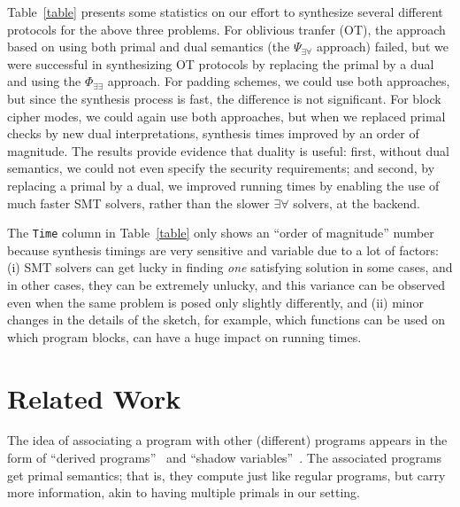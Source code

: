 \documentclass[preprint]{sig-alternate-05-2015}
\begin{document}
Table~\ref{table} presents some statistics on our effort to synthesize 
several different protocols for the above three problems. 
For oblivious tranfer (OT), the approach based on using both primal and dual
semantics (the $\Psi_{\exists\forall}$ approach) failed, but we were 
successful in synthesizing OT protocols by replacing the primal by a dual and
using the $\Phi_{\exists\exists}$ approach. 
For padding schemes, we could use both approaches, but since the synthesis process
is fast, the difference is not significant.
For block cipher modes, we could again use both approaches, but when we replaced
primal checks by new dual interpretations, synthesis times improved by an order
of magnitude.  
The results provide evidence that duality is useful: first, without dual
semantics, we could not even specify the security requirements; and second,
by replacing a primal by a dual, we improved running times by enabling the
use of much faster SMT solvers, rather than
the slower $\exists\forall$ solvers, at the backend.

The {\tt{Time}} column in Table~\ref{table} only shows an
``order of magnitude'' number because synthesis timings are very sensitive and
variable due to a lot of factors: (i) SMT solvers can get lucky in finding {\em{one}}
satisfying solution in some cases, and in other cases, they can be extremely unlucky,
and this variance can be observed even when the same problem is
posed only slightly differently, and (ii) minor changes in the details of the sketch,
for example, which functions can be used on which program blocks, can have a huge
impact on running times.


\section{Related Work}

The idea of associating a program with other (different) programs
appears in the form of ``derived programs''~\cite{clt92}
and ``shadow variables''~\cite{DBLP:journals/scp/Morgan09}.
The associated programs get primal semantics; that is, they
compute just like regular programs, but carry more information, akin to
having multiple primals in our setting.
\end{document}
